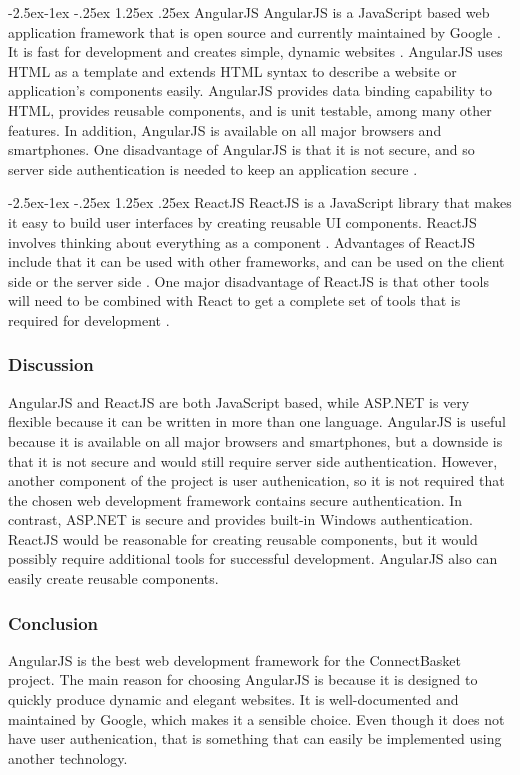 \documentclass[onecolumn, draftclsnofoot,10pt, compsoc]{IEEEtran}
\makeatletter
\renewcommand\paragraph{\@startsection{paragraph}{4}{\z@}%
            {-2.5ex\@plus -1ex \@minus -.25ex}%
            {1.25ex \@plus .25ex}%
            {\normalfont\normalsize\bfseries}}
\makeatother
\begin{document}
\paragraph{AngularJS}
AngularJS is a JavaScript based web application framework that is open source and currently maintained by Google \cite{angular}. It is fast for development and creates simple, dynamic websites \cite{angularjs}. AngularJS uses HTML as a template and extends HTML syntax to describe a website or application's components easily. AngularJS provides data binding capability to HTML, provides reusable components, and is unit testable, among many other features. In addition, AngularJS is available on all major browsers and smartphones. One disadvantage of AngularJS is that it is not secure, and so server side authentication is needed to keep an application secure \cite{angular}.

\paragraph{ReactJS}
ReactJS is a JavaScript library that makes it easy to build user interfaces by creating reusable UI components\cite{react}. ReactJS involves thinking about everything as a component \cite{react}. Advantages of ReactJS include that it can be used with other frameworks, and can be used on the client side or the server side \cite{react}. One major disadvantage of ReactJS is that other tools will need to be combined with React to get a complete set of tools that is required for development \cite{react}. 

\subsubsection{Discussion}
AngularJS and ReactJS are both JavaScript based, while ASP.NET is very flexible because it can be written in more than one language. AngularJS is useful because it is available on all major browsers and smartphones, but a downside is that it is not secure and would still require server side authentication. However, another component of the project is user authenication, so it is not required that the chosen web development framework contains secure authentication. In contrast, ASP.NET is secure and provides built-in Windows authentication. ReactJS would be reasonable for creating reusable components, but it would possibly require additional tools for successful development. AngularJS also can easily create reusable components.

\subsubsection{Conclusion}
AngularJS is the best web development framework for the ConnectBasket project. The main reason for choosing AngularJS is because it is designed to quickly produce dynamic and elegant websites. It is well-documented and maintained by Google, which makes it a sensible choice. Even though it does not have user authenication, that is something that can easily be implemented using another technology. 
\end{document}
